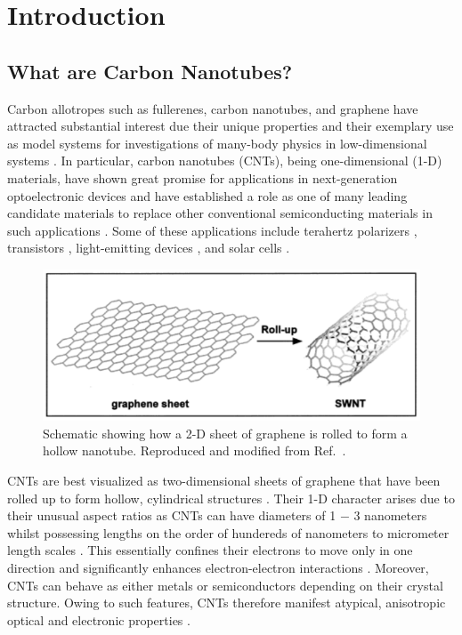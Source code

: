 \chapter{Introduction}

\section{What are Carbon Nanotubes?}

Carbon allotropes such as fullerenes, carbon nanotubes, and graphene have attracted substantial interest due their unique properties and their exemplary use as model systems for investigations of many-body physics in low-dimensional systems \cite{avouris2000carbon, dresselhaus2001introduction,jorio2007carbon, nanot2012optoelectronic, zaytseva2016carbon, soavi2016ultrafast}. In particular, carbon nanotubes (CNTs), being one-dimensional (1-D) materials, have shown great promise for applications in next-generation optoelectronic devices and have established a role as one of many leading candidate materials to replace other conventional semiconducting materials in such applications \cite{nanot2012optoelectronic}. Some of these applications include terahertz polarizers \cite{ren2009carbon}, transistors \cite{qiu2017scaling}, light-emitting devices \cite{liu2015electrically}, and solar cells \cite{kongkanand2007single}.

\begin{figure}[H]
	\centering
	\includegraphics[scale=0.8]{images/chapter_intro/rolled_up_graphene.png}
	\caption{Schematic showing how a 2-D sheet of graphene is rolled to form a hollow nanotube. Reproduced and modified from Ref.\ \cite{odom2000structure}.}
\end{figure}

CNTs are best visualized as two-dimensional sheets of graphene that have been rolled up to form hollow, cylindrical structures \cite{odom2000structure,charlier2007electronic}. Their 1-D character arises due to their unusual aspect ratios as CNTs can have diameters of 1 $-$ 3 nanometers whilst possessing lengths on the order of hundereds of nanometers to micrometer length scales \cite{zaytseva2016carbon, ando1997excitons}. This essentially confines their electrons to move only in one direction and significantly enhances electron-electron interactions \cite{ando1997excitons}. Moreover, CNTs can behave as either metals or semiconductors depending on their crystal structure. Owing to such features, CNTs therefore manifest atypical, anisotropic optical and electronic properties \cite{dresselhaus2001introduction, jorio2007carbon, weismanKonoBook}.

